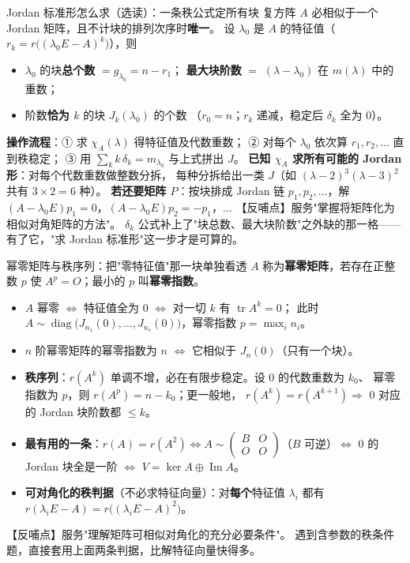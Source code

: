 \begin{fdeep}{Jordan 标准形怎么求（选读）：一条秩公式定所有块}
复方阵 $A$ 必相似于一个 Jordan 矩阵，且不计块的排列次序时\textbf{唯一}。
设 $\lambda_0$ 是 $A$ 的特征值（$r_k=r\bigl((\lambda_0E-A)^{k}\bigr)$），则
\begin{itemize}[leftmargin=1.8em,itemsep=0.15em]
\item $\lambda_0$ 的块\textbf{总个数} $=g_{\lambda_0}=n-r_1$；
      \textbf{最大块阶数} $=$ $(\lambda-\lambda_0)$ 在 $m(\lambda)$ 中的重数；
\item 阶数\textbf{恰为 $k$} 的块 $J_k(\lambda_0)$ 的个数
      （$r_0=n$；$r_k$ 递减，稳定后 $\delta_k$ 全为 $0$）。
\end{itemize}
\textbf{操作流程}：① 求 $\chi_A(\lambda)$ 得特征值及代数重数；
② 对每个 $\lambda_0$ 依次算 $r_1,r_2,\dots$ 直到秩稳定；
③ 用 $\sum_k k\,\delta_k=m_{\lambda_0}$ 与上式拼出 $J$。
\textbf{已知 $\chi_A$ 求所有可能的 Jordan 形}：对每个代数重数做整数分拆，
每种分拆给出一类 $J$（如 $(\lambda-2)^{3}(\lambda-3)^{2}$ 共有 $3\times2=6$ 种）。
\textbf{若还要矩阵 $P$}：按块排成 Jordan 链 $p_1,p_2,\dots$，解
$(A-\lambda_0E)p_1=0$，$(A-\lambda_0E)p_2=-p_1$，$\dots$
【反哺点】服务"掌握将矩阵化为相似对角矩阵的方法"。
$\delta_k$ 公式补上了"块总数、最大块阶数"之外缺的那一格——
有了它，"求 Jordan 标准形"这一步才是可算的。
\end{fdeep}

\begin{fdeep}{幂零矩阵与秩序列：把"零特征值"那一块单独看透}
$A$ 称为\textbf{幂零矩阵}，若存在正整数 $p$ 使 $A^{p}=O$；最小的 $p$ 叫\textbf{幂零指数}。
\begin{itemize}[leftmargin=1.8em,itemsep=0.15em]
\item $A$ 幂零 $\iff$ 特征值全为 $0$ $\iff$ 对一切 $k$ 有 $\operatorname{tr}A^{k}=0$；
      此时 $A\sim\operatorname{diag}\bigl(J_{n_1}(0),\dots,J_{n_s}(0)\bigr)$，幂零指数 $p=\max_i n_i$。
\item $n$ 阶幂零矩阵的幂零指数为 $n$ $\iff$ 它相似于 $J_n(0)$（只有一个块）。
\item \textbf{秩序列}：$r(A^{k})$ 单调不增，必在有限步稳定。设 $0$ 的代数重数为 $k_0$、
      幂零指数为 $p$，则 $r(A^{p})=n-k_0$；更一般地，
      $r(A^{k})=r(A^{k+1})\Longrightarrow$ $0$ 对应的 Jordan 块阶数都 $\le k$。
\item \textbf{最有用的一条}：$r(A)=r(A^{2})\iff A\sim
      \begin{pmatrix}B&O\\O&O\end{pmatrix}$（$B$ 可逆）$\iff$ $0$ 的 Jordan 块全是一阶
      $\iff$ $V=\ker A\oplus\operatorname{Im}A$。
\item \textbf{可对角化的秩判据}（不必求特征向量）：对\textbf{每个}特征值 $\lambda_i$ 都有
      $r(\lambda_iE-A)=r\bigl((\lambda_iE-A)^{2}\bigr)$。
\end{itemize}
【反哺点】服务"理解矩阵可相似对角化的充分必要条件"。
遇到含参数的秩条件题，直接套用上面两条判据，比解特征向量快得多。
\end{fdeep}

